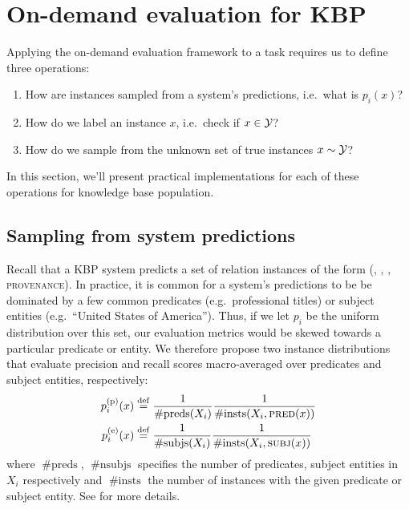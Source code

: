 \section{On-demand evaluation for KBP}
\label{sec:application}
Applying the on-demand evaluation framework to a task requires us to define three operations:
\begin{enumerate}
  \item How are instances sampled  from a system's predictions, i.e.\ what is $p_i(x)$?
  \item How do we label an instance $x$, i.e.\ check if $x \in \mathcal{Y}$?
  \item How do we sample from the unknown set of true instances $x \sim \mathcal{Y}$?
\end{enumerate}
In this section, we'll present practical implementations for each of these operations for knowledge base population.

\subsection{Sampling from system predictions}
Recall that a KBP system predicts a set of relation instances of the form (, , , \textsc{provenance}).
In practice, it is common for a system's predictions
to be be dominated by a few common predicates (e.g.\ professional titles) or
subject entities (e.g.\ ``United States of America'').
Thus, if we let $p_i$ be the uniform distribution over this set,
our evaluation metrics would be skewed towards a particular predicate or entity.
We therefore propose two instance distributions that evaluate precision and recall scores macro-averaged over predicates and subject entities, respectively:
\begin{align*}
  p_i^\text{(p)}(x) &\stackrel{\rm def}{=} \frac{1}{\operatorname{\#preds}(X_i)} \frac{1}{\operatorname{\#insts}(X_i, {\textsc{pred}}(x))} \\
  p_i^\text{(e)}(x) &\stackrel{\rm def}{=} \frac{1}{\operatorname{\#subjs}(X_i)} \frac{1}{\operatorname{\#insts}(X_i, {\textsc{subj}}(x))}
\end{align*}
where $\operatorname{\#preds}$, $\operatorname{\#nsubjs}$ specifies the number of predicates, subject entities in $X_i$ respectively and $\operatorname{\#insts}$ the number of instances with the given predicate or subject entity.
See  for more details.

